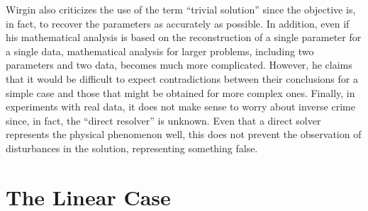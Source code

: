 			Wirgin also criticizes the use of the term ``trivial solution'' since the objective is, in fact, to recover the parameters as accurately as possible. In addition, even if his mathematical analysis is based on the reconstruction of a single parameter for a single data, mathematical analysis for larger problems, including two parameters and two data, becomes much more complicated. However, he claims that it would be difficult to expect contradictions between their conclusions for a simple case and those that might be obtained for more complex ones. Finally, in experiments with real data, it does not make sense to worry about inverse crime since, in fact, the ``direct resolver'' is unknown. Even that a direct solver represents the physical phenomenon well, this does not prevent the observation of disturbances in the solution, representing something false.
		
	\section{The Linear Case}\label{chap:methods:linear}
			
